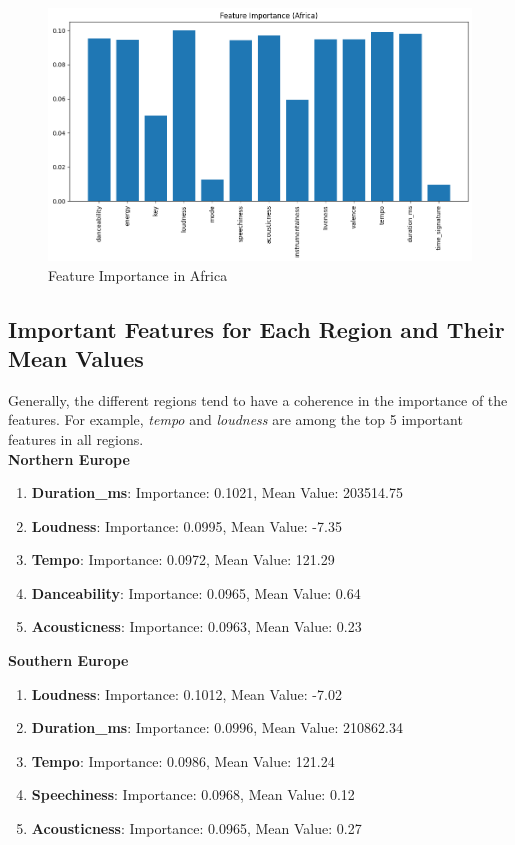 \begin{figure}[h]
    \centering
    \begin{minipage}{0.45\textwidth}
        \centering
        \includegraphics[width=\linewidth]{media/rf_feature_imp_africa.png}
        \caption{Feature Importance in Africa}
    \end{minipage}
\end{figure}

\clearpage 

\subsection{Important Features for Each Region and Their Mean Values}

Generally, the different regions tend to have a coherence in the importance of the features. For example, \textit{tempo} and \textit{loudness} are among the top 5 important features in all regions. \\



\textbf{Northern Europe}
\begin{enumerate}
    \item \textbf{Duration\_ms}: Importance: 0.1021, Mean Value: 203514.75
    \item \textbf{Loudness}: Importance: 0.0995, Mean Value: -7.35
    \item \textbf{Tempo}: Importance: 0.0972, Mean Value: 121.29
    \item \textbf{Danceability}: Importance: 0.0965, Mean Value: 0.64
    \item \textbf{Acousticness}: Importance: 0.0963, Mean Value: 0.23
\end{enumerate}

\textbf{Southern Europe}
\begin{enumerate}
    \item \textbf{Loudness}: Importance: 0.1012, Mean Value: -7.02
    \item \textbf{Duration\_ms}: Importance: 0.0996, Mean Value: 210862.34
    \item \textbf{Tempo}: Importance: 0.0986, Mean Value: 121.24
    \item \textbf{Speechiness}: Importance: 0.0968, Mean Value: 0.12
    \item \textbf{Acousticness}: Importance: 0.0965, Mean Value: 0.27
\end{enumerate}

